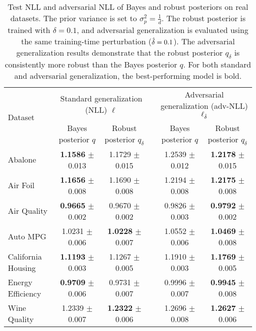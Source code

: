 \begin{table*}[t]
    \centering
    \begin{tabular}{lccccc}
    \toprule
    \multirow{2}{*}{Dataset}  %
       & \multicolumn{2}{c}{Standard generalization (NLL) $\ell$} & \phantom{}& \multicolumn{2}{c}{Adversarial generalization (adv-NLL) $\ell_{\hat{\delta}}$} \\
       & Bayes posterior $q$  & Robust posterior  $q_{\delta}$ & \phantom{}& Bayes posterior $q$ & Robust posterior $q_{\delta}$  \\
       \midrule
       Abalone & \textbf{1.1586} \tiny{$\pm$ 0.013} & 1.1729 \tiny{$\pm$ 0.015} && 1.2539 \tiny{$\pm$ 0.012} & \textbf{1.2178} \tiny{$\pm$ 0.015} \\
       Air Foil & \textbf{1.1656} \tiny{$\pm$ 0.008} & 1.1690 \tiny{$\pm$ 0.008} && 1.2194 \tiny{$\pm$ 0.008} & \textbf{1.2175} \tiny{$\pm$ 0.008} \\
       Air Quality & \textbf{0.9665} \tiny{$\pm$ 0.002} & 0.9670 \tiny{$\pm$ 0.002} && 0.9826 \tiny{$\pm$ 0.003} & \textbf{0.9792} \tiny{$\pm$ 0.002} \\
       Auto MPG & 1.0231 \tiny{$\pm$ 0.006} & \textbf{1.0228} \tiny{$\pm$ 0.007} && 1.0552 \tiny{$\pm$ 0.006} & \textbf{1.0469} \tiny{$\pm$ 0.008} \\
       California Housing & \textbf{1.1193} \tiny{$\pm$ 0.003} & 1.1267 \tiny{$\pm$ 0.005} && 1.1910 \tiny{$\pm$ 0.003} & \textbf{1.1769} \tiny{$\pm$ 0.005} \\
       Energy Efficiency & \textbf{0.9709} \tiny{$\pm$ 0.006} & 0.9731 \tiny{$\pm$ 0.007} && 0.9996 \tiny{$\pm$ 0.007} & \textbf{0.9945} \tiny{$\pm$ 0.008} \\
       Wine Quality & 1.2339 \tiny{$\pm$ 0.007} & \textbf{1.2322} \tiny{$\pm$ 0.006} && 1.2696 \tiny{$\pm$ 0.008} & \textbf{1.2627} \tiny{$\pm$ 0.006} \\
       \bottomrule
    \end{tabular}
    \caption{%
    Test NLL and adversarial NLL of Bayes and robust posteriors on real datasets. The prior variance is set to $\sigma_p^2 = \frac{1}{d}$. The robust posterior is trained with $\delta=0.1$, and adversarial generalization is evaluated using the same training-time perturbation ($\hat{\delta}=0.1$). The adversarial generalization results demonstrate that the robust posterior $q_\delta$ is consistently more robust than the Bayes posterior $q$. For both standard and adversarial generalization, the best-performing model is bold.
       \label{tab:real_data} }
       \vspace{-0.3cm}
\end{table*}

